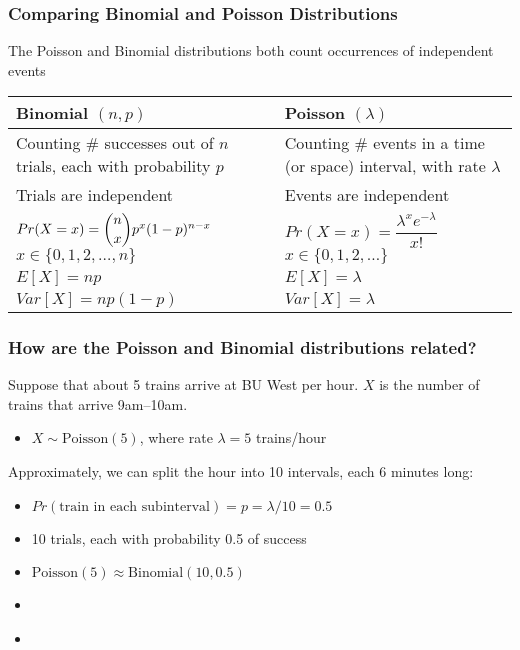 \documentclass[slidestop,compress,mathserif]{beamer}
\begin{document}
\begin{frame}
\frametitle{Comparing Binomial and Poisson Distributions}

The Poisson and Binomial distributions both count occurrences of independent events

\vspace{0.3cm}

\begin{tabular}{|p{}|p{}|}
\hline
\rowcolor{gray!20}
\textbf{Binomial $(n, p)$} & \textbf{Poisson $(\lambda)$} \\
\hline
Counting \# successes out of $n$ trials, each with probability $p$ & Counting \# events in a time (or space) interval, with rate $\lambda$ \\
\hline
Trials are independent & Events are independent \\
\hline
$Pr(X = x) = \dbinom{n}{x} p^x (1-p)^{n-x}$ \newline $x \in \{0,1,2,\ldots,n\}$ & $Pr(X = x) = \dfrac{\lambda^x e^{-\lambda}}{x!}$ \newline $x \in \{0,1,2,\ldots\}$ \\
\hline
$E[X] = np$ & $E[X] = \lambda$ \\
\hline
$Var[X] = np(1-p)$ & $Var[X] = \lambda$ \\
\hline
\end{tabular}

\end{frame}


\begin{frame}
\frametitle{How are the Poisson and Binomial distributions related?}

\begin{small}
Suppose that about 5 trains arrive at BU West per hour. $X$ is the number of trains that arrive 9am--10am.
    \begin{itemize}
        \item $X \sim \text{Poisson}(5)$, where rate $\lambda = 5$ trains/hour
    \end{itemize}
    \pause
Approximately, we can split the hour into 10 intervals, each 6 minutes long:
    \begin{itemize}
        \item $Pr(\text{train in each subinterval}) = p = \lambda/10 = 0.5$
        \item 10 trials, each with probability 0.5 of success
        \item $\text{Poisson}(5) \approx \text{Binomial}(10, 0.5)$
        \item \textcolor{teal}{}
        \item \textcolor{teal}{}
    \end{itemize}

\end{small}

\end{frame}
\end{document}
